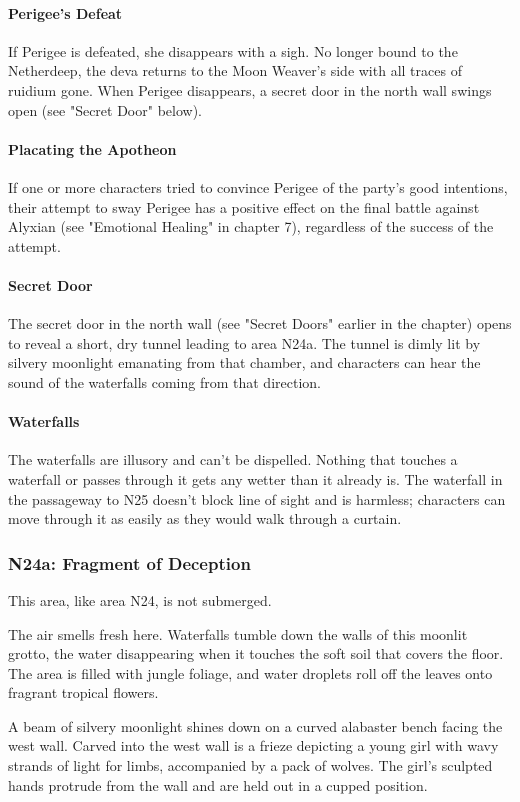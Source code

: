 \documentclass[10pt,a4paper,twoside,bg=print,twocolumn,openany,nodeprecatedcode]{dndbook}
\begin{document}
\paragraph{Perigee's Defeat}
If Perigee is defeated, she disappears with a sigh. No longer bound to the Netherdeep, the deva returns to the Moon Weaver's side with all traces of ruidium gone. When Perigee disappears, a secret door in the north wall swings open (see "Secret Door" below).

\paragraph{Placating the Apotheon}
If one or more characters tried to convince Perigee of the party's good intentions, their attempt to sway Perigee has a positive effect on the final battle against Alyxian (see "Emotional Healing" in chapter 7), regardless of the success of the attempt.

\paragraph{Secret Door}
The secret door in the north wall (see "Secret Doors" earlier in the chapter) opens to reveal a short, dry tunnel leading to area N24a. The tunnel is dimly lit by silvery moonlight emanating from that chamber, and characters can hear the sound of the waterfalls coming from that direction.

\paragraph{Waterfalls}
The waterfalls are illusory and can't be dispelled. Nothing that touches a waterfall or passes through it gets any wetter than it already is. The waterfall in the passageway to N25 doesn't block line of sight and is harmless; characters can move through it as easily as they would walk through a curtain.

\subsubsection{N24a: Fragment of Deception}
This area, like area N24, is not submerged.

\begin{DndReadAloud}{}
The air smells fresh here. Waterfalls tumble down the walls of this moonlit grotto, the water disappearing when it touches the soft soil that covers the floor. The area is filled with jungle foliage, and water droplets roll off the leaves onto fragrant tropical flowers.

A beam of silvery moonlight shines down on a curved alabaster bench facing the west wall. Carved into the west wall is a frieze depicting a young girl with wavy strands of light for limbs, accompanied by a pack of wolves. The girl's sculpted hands protrude from the wall and are held out in a cupped position.

\end{DndReadAloud}
\end{document}
